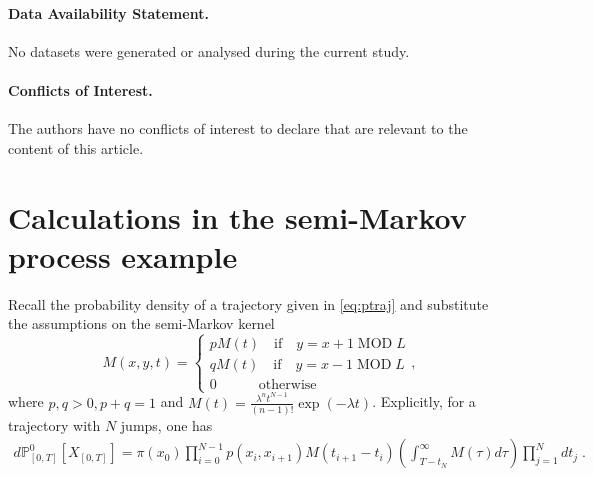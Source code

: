 \documentclass[a4paper,11pt]{article}
\numberwithin{equation}{section}
\begin{document}
\paragraph{Data Availability Statement.} No datasets were generated or analysed during the current study.

\paragraph{Conflicts of Interest.} The authors have no conflicts of interest to declare that are relevant to the content of this article.


\appendix

\section{Calculations in the semi-Markov process example}
\label{app_semimarkov}

Recall the probability density of a trajectory given in \eqref{eq:ptraj} and substitute the assumptions on the semi-Markov kernel 
\begin{equation}\label{eq:rw}
    M(x,y,t) = 
    \begin{cases}
        p M(t) \quad  \mathrm{if} \quad  y = x+1 \; \mathrm{MOD} \; L \\
        q M(t) \quad  \mathrm{if} \quad  y = x-1 \; \mathrm{MOD} \; L \\
        0 \quad\quad\quad  \mathrm{otherwise}
    \end{cases}, 
\end{equation}
where $p,q >0, p+q=1$ and $M(t)= \frac{\lambda^{n}t^{N-1}}{\left(n-1\right)!}\exp\left(-\lambda t\right)$. Explicitly, for a trajectory with $N$ jumps, one has
\begin{align}
    d \mathbb{P}_{[0,T]}^0 [X_{[0,T]}] = \pi(x_0) \prod_{i=0}^{N-1} p(x_i,x_{i+1}) M(t_{i+1}-t_i) \left(\int_{T-t_N}^{\infty} M(\tau) d\tau \right) \prod_{j=1}^{N} dt_j \;.
\end{align}
\end{document}
